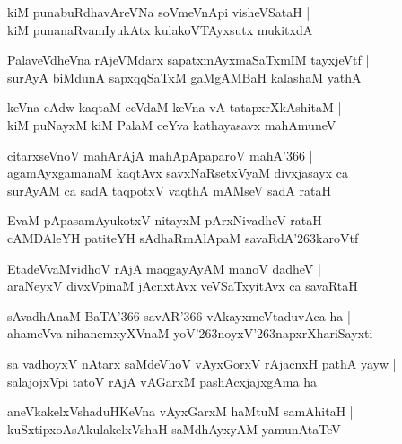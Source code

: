 \begin{shloka}
kiM punabuRdhavAreVNa soVmeVnApi visheVSataH |\\
kiM punanaRvamIyukAtx kulakoVTAyxsutx mukitxdA
\end{shloka}

\begin{shloka}
PalaveVdheVna rAjeVMdarx sapatxmAyxmaSaTxmIM tayxjeVtf |\\
surAyA biMdunA sapxqqSaTxM gaMgAMBaH kalashaM yathA
\end{shloka}

\begin{shloka}
keVna cAdw kaqtaM ceVdaM keVna vA tatapxrXkAshitaM |\\
kiM puNayxM kiM PalaM ceYva kathayasavx mahAmuneV
\end{shloka}

\begin{shloka}
citarxseVnoV mahArAjA mahApApaparoV mahA\char'366 |\\
agamAyxgamanaM kaqtAvx savxNaRsetxVyaM divxjasayx ca |\\
surAyAM ca sadA taqpotxV vaqthA mAMseV sadA rataH
\end{shloka}

\begin{shloka}
EvaM pApasamAyukotxV nitayxM pArxNivadheV rataH |\\
cAMDAleYH patiteYH sAdhaRmAlApaM savaRdA\char'263karoVtf
\end{shloka}

\begin{shloka}
EtadeVvaMvidhoV rAjA maqgayAyAM manoV dadheV |\\
araNeyxV divxVpinaM jAcnxtAvx veVSaTxyitAvx ca savaRtaH 
\end{shloka}

\begin{shloka}
sAvadhAnaM BaTA\char'366 savAR\char'366 vAkayxmeVtaduvAca ha |\\
ahameVva nihanemxyXVnaM yoV\char'263noyxV\char'263napxrXhariSayxti
\end{shloka}

\begin{shloka}
sa vadhoyxV nAtarx saMdeVhoV vAyxGorxV rAjacnxH pathA yayw |\\
salajojxVpi tatoV rAjA vAGarxM pashAcxjajxgAma ha 
\end{shloka}

\begin{shloka}
aneVkakelxVshaduHKeVna vAyxGarxM haMtuM samAhitaH |\\
kuSxtipxoAsAkulakelxVshaH saMdhAyxyAM yamunAtaTeV
\end{shloka}

